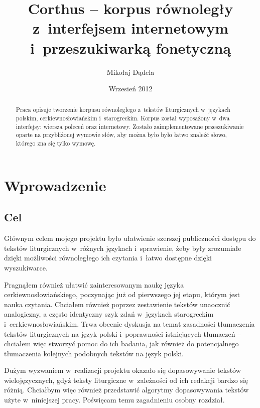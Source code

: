 \documentclass{pracamgr}
\author{Mikołaj Dądela}
\title{Corthus -- korpus równoległy z~interfejsem internetowym
  i~przeszukiwarką fonetyczną}
\date{Wrzesień 2012}
\begin{document}
\maketitle

\begin{abstract}
  Praca opisuje tworzenie korpusu równoległego z~tekstów liturgicznych
  w~językach polskim, cerkiewno\-{}słowiańskim
  i~staro\-{}greckim. Korpus został wyposażony w~dwa interfejsy:
  wiersza poleceń oraz internetowy. Zostało zaimplementowane
  przeszukiwanie oparte na przybliżonej wymowie słów, aby można
  było było łatwo znaleźć słowo, którego zna się tylko wymowę.
\end{abstract}

\tableofcontents


\chapter*{Wprowadzenie}

\section*{Cel}\label{cel}

Głównym celem mojego projektu było ułatwienie szerszej publiczności
dostępu do tekstów liturgicznych w~różnych językach i~sprawienie, żeby
były zrozumiałe dzięki możliwości równoległego ich czytania i~łatwo
dostępne dzięki wyszukiwarce.

Pragnąłem również ułatwić zainteresowanym naukę języka
cerkiewno\-{}słowiańskiego, poczynając już od pierwszego jej etapu,
którym jest nauka czytania. Chciałem również poprzez zestawienie
tekstów unaocznić analogiczny, a często identyczny szyk zdań
w~językach starogreckim i~cerkiewno\-{}słowiańskim. Trwa obecnie
dyskusja na temat zasadności tłumaczenia tekstów liturgicznych na
język polski i~poprawności istniejących tłumaczeń -- chciałem więc
stworzyć pomoc do ich badania, jak również do potencjalnego
tłumaczenia kolejnych podobnych tekstów na język polski.

Dużym wyzwaniem w~realizacji projektu okazało się dopasowywanie
tekstów wielojęzycznych, gdyż teksty liturgiczne w~zależności od ich
redakcji bardzo się różnią. Chciałbym więc również przedstawić
algorytmy dopasowywania tekstów użyte w~niniejszej pracy. Poświęcam
temu zagadnieniu osobny rozdział.
\end{document}
